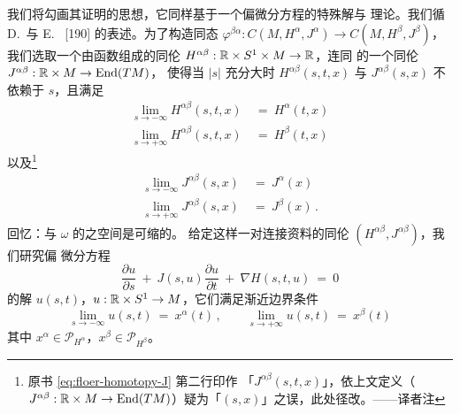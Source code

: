 我们将勾画其证明的思想，它同样基于一个偏微分方程的特殊解与\trFredholm{}%
理论。我们循 D.~\trSalamon{}与 E.~\trZehnder{} [190] 的表述。为了构造同态%
$\varphi^{\beta\alpha}:C(M,H^{\alpha},J^{\alpha})\to C(M,H^{\beta},J^{\beta})$，%
我们选取一个由\trHamiltonian{}函数组成的\trSmooth{}同伦%
$H^{\alpha\beta}:\mathbb{R}\times S^{1}\times M\to\mathbb{R}$，连同\trAlmostComplexStructure{}%
的一个\trSmooth{}同伦 $J^{\alpha\beta}:\mathbb{R}\times M\to\operatorname{End}(TM)$，%
使得当 $|s|$ 充分大时 $H^{\alpha\beta}(s,t,x)$ 与 $J^{\alpha\beta}(s,x)$ 不%
依赖于 $s$，且满足
\begin{equation}\label{eq:floer-homotopy-H}
\begin{aligned}
\lim_{s\to-\infty}H^{\alpha\beta}(s,t,x)\ &=\ H^{\alpha}(t,x)\\
\lim_{s\to+\infty}H^{\alpha\beta}(s,t,x)\ &=\ H^{\beta}(t,x)
\end{aligned}
\end{equation}
以及\footnote{原书 \eqref{eq:floer-homotopy-J} 第二行印作%
「$J^{\alpha\beta}(s,t,x)$」，依上文定义（$J^{\alpha\beta}:\R\times M\to%
\operatorname{End}(TM)$）疑为「$(s,x)$」之误，此处径改。——译者注}
\begin{equation}\label{eq:floer-homotopy-J}
\begin{aligned}
\lim_{s\to-\infty}J^{\alpha\beta}(s,x)\ &=\ J^{\alpha}(x)\\
\lim_{s\to+\infty}J^{\alpha\beta}(s,x)\ &=\ J^{\beta}(x)\,.
\end{aligned}
\end{equation}
回忆：与 $\omega$ \trCompatible{}的\trAlmostComplexStructure{}之空间是可缩的。%
给定这样一对连接资料的同伦 $(H^{\alpha\beta},J^{\alpha\beta})$，我们研究偏%
微分方程
\begin{equation}\label{eq:floer-homotopy-pde}
\frac{\partial u}{\partial s}\ +\ J(s,u)\frac{\partial u}{\partial t}\ +\ \nabla H(s,t,u)\ =\ 0
\end{equation}
的\trSmooth{}解 $u(s,t)$，$u:\mathbb{R}\times S^{1}\to M$，它们满足渐近边界条件
\begin{equation}\label{eq:floer-homotopy-bc}
\lim_{s\to-\infty}u(s,t)\ =\ x^{\alpha}(t)\,,\qquad \lim_{s\to+\infty}u(s,t)\ =\ x^{\beta}(t)
\end{equation}
其中 $x^{\alpha}\in\mathcal{P}_{H^{\alpha}}$，$x^{\beta}\in\mathcal{P}_{H^{\beta}}$。

